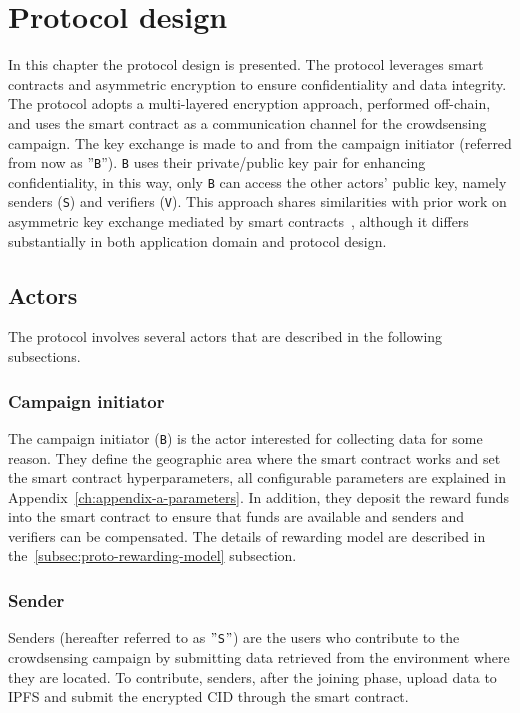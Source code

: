 \chapter{Protocol design} \label{ch:protocol-design}
In this chapter the protocol design is presented.
The protocol leverages smart contracts and asymmetric encryption to ensure confidentiality and data integrity.
The protocol adopts a multi-layered encryption approach, performed off-chain, and uses the smart contract as a communication channel for the crowdsensing campaign.
The key exchange is made to and from the campaign initiator (referred from now as ''\texttt{B}'').
\texttt{B} uses their private/public key pair for enhancing confidentiality, in this way, only \texttt{B} can access the other actors' public key, namely senders (\texttt{S}) and verifiers (\texttt{V}).
This approach shares similarities with prior work on asymmetric key exchange mediated by smart contracts~\cite{muth2020smartdhx}, although it differs substantially in both application domain and protocol design.

\section{Actors}\label{sec:actors}
The protocol involves several actors that are described in the following subsections.

\subsection{Campaign initiator}\label{subsec:campaign-initiator}
The campaign initiator (\texttt{B}) is the actor interested for collecting data for some reason.
They define the geographic area where the smart contract works and set the smart contract hyperparameters, all configurable parameters are explained in Appendix~\ref{ch:appendix-a-parameters}.
In addition, they deposit the reward funds into the smart contract to ensure that funds are available and senders and verifiers can be compensated.
The details of rewarding model are described in the~\ref{subsec:proto-rewarding-model} subsection.

\subsection{Sender}\label{subsec:sender}
Senders (hereafter referred to as \("\)\texttt{S}\("\)) are the users who contribute to the crowdsensing campaign by submitting data retrieved from the environment where they are located.
To contribute, senders, after the joining phase, upload data to IPFS and submit the encrypted CID through the smart contract.

